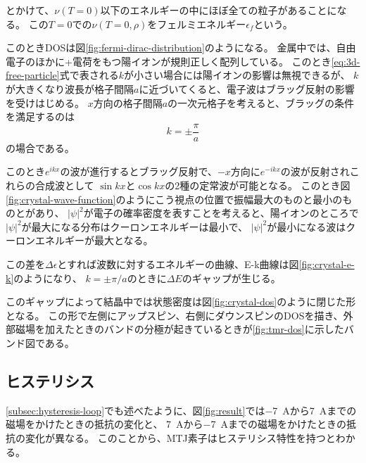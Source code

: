 \documentclass[../../../main]{subfiles}
\begin{document}
とかけて、$\nu(T=0)$以下のエネルギーの中にほぼ全ての粒子があることになる。
この$T=0$での$\nu(T=0, \rho)$をフェルミエネルギー$\epsilon_f$という。

このときDOSは図\ref{fig:fermi-dirac-distribution}のようになる。
金属中では、自由電子のほかに+電荷をもつ陽イオンが規則正しく配列している。
このとき\ref{eq:3d-free-particle}式で表される$k$が小さい場合には陽イオンの影響は無視できるが、
$k$が大きくなり波長が格子間隔$a$に近づいてくると、電子波はブラッグ反射の影響を受けはじめる。
$x$方向の格子間隔$a$の一次元格子を考えると、ブラッグの条件を満足するのは
\begin{equation}
	k = \pm \dfrac{\pi}{a}
\end{equation}
の場合である。

このとき$e^{ikx}$の波が進行するとブラッグ反射で、$-x$方向に$e^{-ikx}$の波が反射されこれらの合成波として
$\sin kx$と$\cos kx$の2種の定常波が可能となる。
このとき図\ref{fig:crystal-wave-function}のようにこう視点の位置で振幅最大のものと最小のものとがあり、
$|\psi|^2$が電子の確率密度を表すことを考えると、陽イオンのところで$|\psi|^2$が最大になる分布はクーロンエネルギーは最小で、
$|\psi|^2$が最小になる波はクーロンエネルギーが最大となる。

この差を$\Delta \epsilon$とすれば波数に対するエネルギーの曲線、E-k曲線は図\ref{fig:crystal-e-k}のようになり、
$k=\pm \pi/a$のときに$\Delta E$のギャップが生じる。

このギャップによって結晶中では状態密度は図\ref{fig:crystal-dos}のように閉じた形となる。
この形で左側にアップスピン、右側にダウンスピンのDOSを描き、外部磁場を加えたときのバンドの分極が起きているときが\ref{fig:tmr-dos}に示したバンド図である。



\subsection{ヒステリシス}\label{subsec:hysteresis}
\ref{subsec:hysteresis-loop}でも述べたように、図\ref{fig:result}では\SI{-7}{A}から\SI{7}{A}までの磁場をかけたときの抵抗の変化と、
\SI{7}{A}から\SI{-7}{A}までの磁場をかけたときの抵抗の変化が異なる。
このことから、MTJ素子はヒステリシス特性を持つとわかる。
\end{document}
